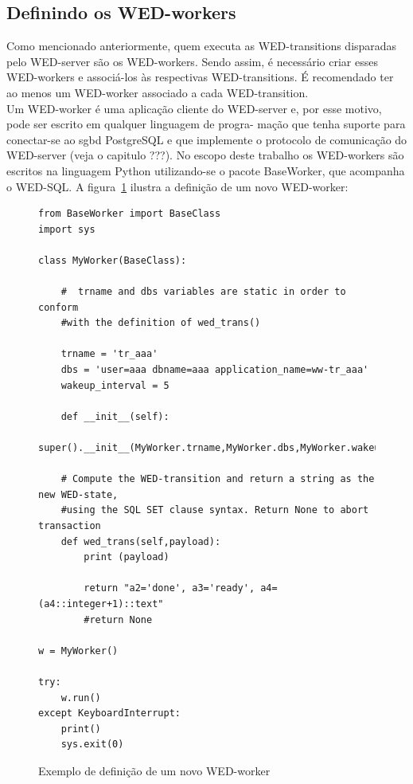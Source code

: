 \documentclass[conference]{IEEEtran}
\begin{document}
\subsection{Definindo os WED-workers}
Como mencionado anteriormente, quem executa as WED-transitions disparadas pelo WED-server são os WED-workers. Sendo assim,
é necessário criar esses WED-workers e associá-los às respectivas WED-transitions. É recomendado ter ao menos um WED-worker
associado a cada WED-transition.
\\
\indent Um WED-worker é uma aplicação cliente do WED-server e, por esse motivo, pode ser escrito em qualquer linguagem de progra-
mação que tenha suporte para conectar-se ao sgbd PostgreSQL e que implemente o protocolo de comunicação do WED-server (veja
o capitulo ???). No escopo deste trabalho os WED-workers são escritos na linguagem Python utilizando-se o pacote BaseWorker, 
que acompanha o WED-SQL. A figura~\ref{fig_ww} ilustra a definição de um novo WED-worker:

\begin{figure}[!t]
\begin{Verbatim}[fontsize=\tiny]
from BaseWorker import BaseClass
import sys

class MyWorker(BaseClass):
    
    #  trname and dbs variables are static in order to conform 
    #with the definition of wed_trans()
        
    trname = 'tr_aaa'
    dbs = 'user=aaa dbname=aaa application_name=ww-tr_aaa'
    wakeup_interval = 5
    
    def __init__(self):
        super().__init__(MyWorker.trname,MyWorker.dbs,MyWorker.wakeup_interval)
    
    # Compute the WED-transition and return a string as the new WED-state, 
    #using the SQL SET clause syntax. Return None to abort transaction
    def wed_trans(self,payload):
        print (payload)
        
        return "a2='done', a3='ready', a4=(a4::integer+1)::text"
        #return None
        
w = MyWorker()

try:
    w.run()
except KeyboardInterrupt:
    print()
    sys.exit(0)
\end{Verbatim}
\caption{Exemplo de definição de um novo WED-worker}
\label{fig_ww}
\end{figure}
\end{document}
